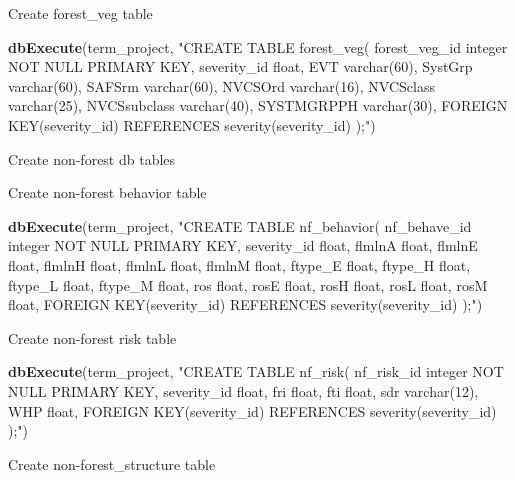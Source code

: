 \documentclass[]{book}
\newenvironment{Shaded}{\begin{snugshade}}{\end{snugshade}}
\newcommand{\KeywordTok}[1]{\textcolor[rgb]{0.13,0.29,0.53}{\textbf{#1}}}
\newcommand{\NormalTok}[1]{#1}
\newcommand{\StringTok}[1]{\textcolor[rgb]{0.31,0.60,0.02}{#1}}
\begin{document}
Create forest\_veg table

\begin{Shaded}
\begin{Highlighting}[]
\KeywordTok{dbExecute}\NormalTok{(term_project, }\StringTok{"CREATE TABLE forest_veg(}
\StringTok{forest_veg_id integer NOT NULL PRIMARY KEY,}
\StringTok{severity_id float,}
\StringTok{EVT varchar(60),}
\StringTok{SystGrp varchar(60),}
\StringTok{SAFSrm varchar(60),}
\StringTok{NVCSOrd varchar(16),}
\StringTok{NVCSclass varchar(25),}
\StringTok{NVCSsubclass varchar(40),}
\StringTok{SYSTMGRPPH varchar(30),}
\StringTok{FOREIGN KEY(severity_id) REFERENCES severity(severity_id)}
\StringTok{);"}\NormalTok{)}
\end{Highlighting}
\end{Shaded}

Create non-forest db tables

Create non-forest behavior table

\begin{Shaded}
\begin{Highlighting}[]
\KeywordTok{dbExecute}\NormalTok{(term_project, }\StringTok{"CREATE TABLE nf_behavior(}
\StringTok{nf_behave_id integer NOT NULL PRIMARY KEY,}
\StringTok{severity_id float,}
\StringTok{flmlnA float,}
\StringTok{flmlnE float,}
\StringTok{flmlnH float,}
\StringTok{flmlnL float,}
\StringTok{flmlnM float,}
\StringTok{ftype_E float,}
\StringTok{ftype_H float,}
\StringTok{ftype_L float,}
\StringTok{ftype_M float,}
\StringTok{ros float,}
\StringTok{rosE float,}
\StringTok{rosH float,}
\StringTok{rosL float,}
\StringTok{rosM float,}
\StringTok{FOREIGN KEY(severity_id) REFERENCES severity(severity_id)}
\StringTok{);"}\NormalTok{)}
\end{Highlighting}
\end{Shaded}

Create non-forest risk table

\begin{Shaded}
\begin{Highlighting}[]
\KeywordTok{dbExecute}\NormalTok{(term_project, }\StringTok{"CREATE TABLE nf_risk(}
\StringTok{nf_risk_id integer NOT NULL PRIMARY KEY,}
\StringTok{severity_id float,}
\StringTok{fri float,}
\StringTok{fti float,}
\StringTok{sdr varchar(12),}
\StringTok{WHP float,}
\StringTok{FOREIGN KEY(severity_id) REFERENCES severity(severity_id)}
\StringTok{);"}\NormalTok{)}
\end{Highlighting}
\end{Shaded}

Create non-forest\_structure table
\end{document}
